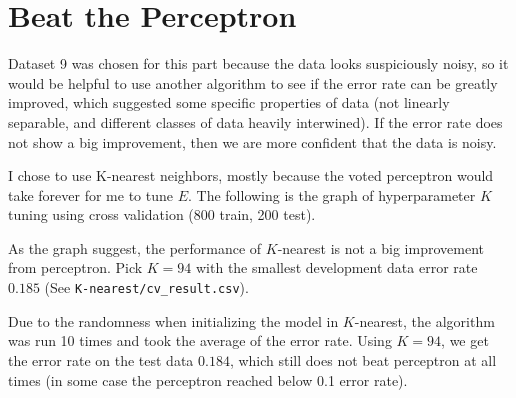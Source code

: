 \documentclass[10pt]{article}
\begin{document}
\section{Beat the Perceptron}
\par Dataset 9 was chosen for this part because the data looks suspiciously noisy, so it would be helpful to use another algorithm to see if the error rate can
be greatly improved, which suggested some specific properties of data (not linearly separable, and different classes of data heavily interwined). If the error
rate does not show a big improvement, then we are more confident that the data is noisy.
\par I chose to use K-nearest neighbors, mostly because the voted perceptron would take forever for me to tune $E$. The following is the graph of hyperparameter
$K$ tuning using cross validation (800 train, 200 test).

\par As the graph suggest, the performance of $K$-nearest is not a big improvement from perceptron. Pick $K=94$ with the smallest development data error rate $0.185$
(See \texttt{K-nearest/cv\_result.csv}). \par
Due to the randomness when initializing the model in $K$-nearest, the algorithm was run 10 times and took the average of the error rate. Using $K=94$, we get the 
error rate on the test data $0.184$, which still does not beat perceptron at all times (in some case the perceptron reached below 0.1 error rate). 
\end{document}
